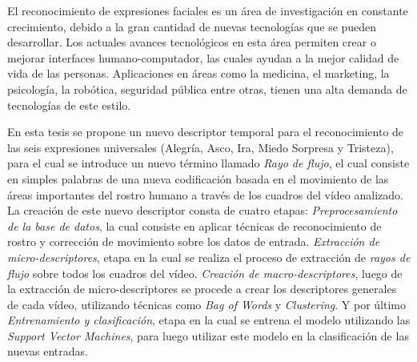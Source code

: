 \documentclass[final]{udpthesis}
\begin{document}
\begin{resumen}
El reconocimiento de expresiones faciales es un área de investigación en constante crecimiento, debido a la gran cantidad de nuevas tecnologías que se pueden desarrollar. Los actuales avances tecnológicos en esta área permiten crear o mejorar interfaces humano-computador, las cuales ayudan a la mejor calidad de vida de las personas. Aplicaciones en áreas como la medicina, el marketing, la psicología, la robótica, seguridad pública entre otras, tienen una alta demanda de tecnologías de este estilo.

En esta tesis se propone un nuevo descriptor temporal para el reconocimiento de las seis expresiones universales (Alegría, Asco, Ira, Miedo Sorpresa y Tristeza), para el cual se introduce un nuevo término llamado \textit{Rayo de flujo}, el cual consiste en simples palabras de una nueva codificación  basada en el movimiento de las áreas importantes del rostro humano a través de los cuadros del vídeo analizado. La creación de este nuevo descriptor consta de cuatro etapas:  \emph{Preprocesamiento de la base de datos}, la cual consiste en aplicar técnicas de reconocimiento de rostro y corrección de movimiento sobre los datos de entrada. \emph{Extracción de micro-descriptores}, etapa en la cual se realiza el proceso de extracción de \textit{rayos de flujo} sobre todos los cuadros del vídeo. \emph{Creación de macro-descriptores}, luego de la extracción de micro-descriptores se procede a crear los descriptores generales de cada vídeo, utilizando técnicas como \textit{Bag of Words} y \textit{Clustering}. Y por último \emph{Entrenamiento y clasificación}, etapa en la cual se entrena el modelo utilizando  las \emph{Support Vector Machines}, para luego utilizar este modelo en la clasificación de las nuevas entradas.
\end{resumen}



\mainmatter










%
% 
\end{document}

